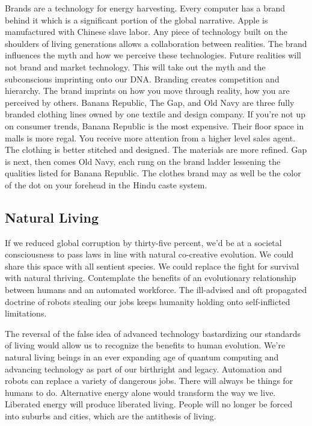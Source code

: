 Brands are a technology for energy harvesting. Every computer has a
brand behind it which is a significant portion of the global narrative.
Apple is manufactured with Chinese slave labor. Any piece of technology
built on the shoulders of living generations allows a collaboration
between realities. The brand influences the myth and how we perceive
these technologies. Future realities will not brand and market
technology. This will take out the myth and the subconscious imprinting
onto our DNA. Branding creates competition and hierarchy. The brand
imprints on how you move through reality, how you are perceived by
others. Banana Republic, The Gap, and Old Navy are three fully branded
clothing lines owned by one textile and design company. If you're not up
on consumer trends, Banana Republic is the most expensive. Their floor
space in malls is more regal. You receive more attention from a higher
level sales agent. The clothing is better stitched and designed. The
materials are more refined. Gap is next, then comes Old Navy, each rung
on the brand ladder lessening the qualities listed for Banana Republic.
The clothes brand may as well be the color of the dot on your forehead
in the Hindu caste system.

\subsection{Natural Living}\label{natural-living}

If we reduced global corruption by thirty-five percent, we'd be at a
societal consciousness to pass laws in line with natural co-creative
evolution. We could share this space with all sentient species. We could
replace the fight for survival with natural thriving. Contemplate the
benefits of an evolutionary relationship between humans and an automated
workforce. The ill-advised and oft propagated doctrine of robots
stealing our jobs keeps humanity holding onto self-inflicted
limitations.

The reversal of the false idea of advanced technology bastardizing our
standards of living would allow us to recognize the benefits to human
evolution. We're natural living beings in an ever expanding age of
quantum computing and advancing technology as part of our birthright and
legacy. Automation and robots can replace a variety of dangerous jobs.
There will always be things for humans to do. Alternative energy alone
would transform the way we live. Liberated energy will produce liberated
living. People will no longer be forced into suburbs and cities, which
are the antithesis of living.

